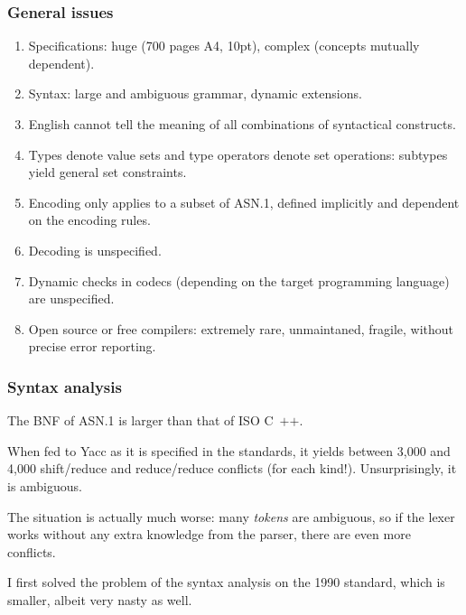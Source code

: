 \documentclass[compress,dvips,xcolor={dvipsnames},t]{beamer}
\newcommand\ASN{\textsf{ASN.1}\xspace}
\newcommand\Cpp{\mbox{\textsf{C} \hspace*{-2.5mm} \raise 0.7mm \hbox
{${\scriptscriptstyle \textsf{++}}$}}\xspace}
\begin{document}
\begin{frame}
\frametitle{General issues}

\begin{enumerate}

  \item Specifications: huge (700 pages A4, 10pt), complex (concepts
    mutually dependent).

  \item Syntax: large and ambiguous grammar, dynamic extensions.

  \item English cannot tell the meaning of all combinations of
    syntactical constructs.

  \item Types denote value sets and type operators denote set
    operations: subtypes yield general set constraints.

  \item Encoding only applies to a subset of \ASN, defined
    implicitly and dependent on the encoding rules.

  \item Decoding is unspecified.

  \item Dynamic checks in codecs (depending on the target programming
    language) are unspecified.

  \item Open source or free compilers: extremely rare, unmaintaned,
    fragile, without precise error reporting.

\end{enumerate}

\end{frame}


\begin{frame}
\frametitle{Syntax analysis}

The BNF of \ASN is larger than that of ISO \Cpp.

\bigskip

When fed to Yacc as it is specified in the standards, it yields
between 3,000 and 4,000 shift/reduce and reduce/reduce conflicts
(for each kind!). Unsurprisingly, it is ambiguous.

\bigskip

The situation is actually much worse: many \emph{tokens} are
ambiguous, so if the lexer works without any extra knowledge from the
parser, there are even more conflicts.

\bigskip

I first solved the problem of the syntax analysis on the 1990
standard, which is smaller, albeit very nasty as well.

\end{frame}
\end{document}
